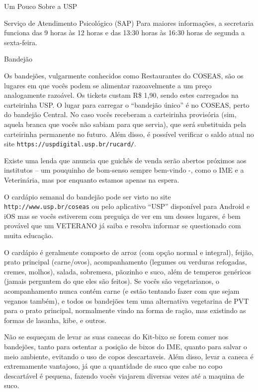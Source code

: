 \begin{secao}{Um Pouco Sobre a USP}
\begin{subsecao}{Serviço de Atendimento Psicológico (SAP)}
Para maiores informações, a secretaria funciona das 9 horas às 12 horas e das
13:30 horas às 16:30 horas de segunda a sexta-feira. 
 
\end{subsecao}

\pagebreak



\begin{subsecao}{Bandejão}


Os bandejões, vulgarmente conhecidos como Restaurantes do COSEAS, são os lugares
em que vocês podem se alimentar razoavelmente a um preço analogamente razoável.
Os tickets custam R\$ 1,90, sendo estes carregados na carteirinha USP. O 
lugar para carregar o ``bandejão único'' é no COSEAS, perto do bandejão 
Central. No caso vocês receberam a carteirinha provisória (sim, aquela 
branca que vocês não sabiam para que servia), que será substituida pela carteirinha
permanente no futuro. Além disso, é possível verificar o saldo atual no
site {\tt https://uspdigital.usp.br/rucard/}.

Existe uma lenda que anuncia que guichês de venda serão abertos próximos aos
institutos – um pouquinho de bom-senso sempre bem-vindo -, como o IME e
a Veterinária, mas por enquanto estamos apenas na espera.

O cardápio semanal do bandejão pode ser visto no site {\tt http://www.usp.br/coseas}
ou pelo aplicativo ``USP'' disponível para Android e iOS mas se vocês estiverem
com preguiça de ver em um desses lugares, é bem provável que um VETERANO já saiba
e resolva informar se questionado com muita educação.

O cardápio é geralmente composto de arroz (com opção normal e integral), feijão,
prato principal (carne/ovos), acompanhamento (legumes ou verduras refogadas, 
cremes, molhos), salada, sobremesa, pãozinho e suco, além de temperos genéricos
(jamais perguntem do que eles são feitos). Se vocês são vegetarianos, o 
acompanhamento nunca contém carne (e estão tentando fazer com que sejam veganos 
também), e todos os bandejões tem uma alternativa vegetarina de PVT para o 
prato principal, normalmente vindo na forma de ração, mas existindo as formas 
de lasanha, kibe, e outros.


Não se esqueçam de levar as suas canecas do Kit-bixo se forem comer nos bandejões,
tanto para ostentar a posição de bixos do IME, quanto para salvar o meio ambiente, 
evitando o uso de copos descartaveis. Além disso, levar a caneca é extremamente
vantajoso, já que a quantidade de suco que cabe no copo descartável é pequena,
fazendo vocês viajarem diversas vezes até a maquina de suco.



\end{subsecao}
\end{secao}
